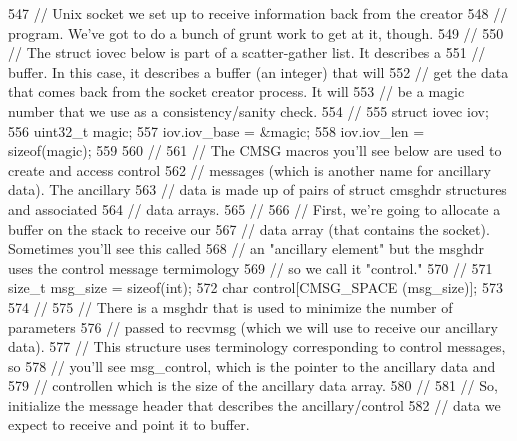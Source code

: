 \begin{DoxyCode}
547       \textcolor{comment}{// Unix socket we set up to receive information back from the creator}
548       \textcolor{comment}{// program.  We've got to do a bunch of grunt work to get at it, though.}
549       \textcolor{comment}{//}
550       \textcolor{comment}{// The struct iovec below is part of a scatter-gather list.  It describes a}
551       \textcolor{comment}{// buffer.  In this case, it describes a buffer (an integer) that will}
552       \textcolor{comment}{// get the data that comes back from the socket creator process.  It will}
553       \textcolor{comment}{// be a magic number that we use as a consistency/sanity check.}
554       \textcolor{comment}{// }
555       \textcolor{keyword}{struct }iovec iov;
556       uint32\_t magic;
557       iov.iov\_base = &magic;
558       iov.iov\_len = \textcolor{keyword}{sizeof}(magic);
559 
560       \textcolor{comment}{//}
561       \textcolor{comment}{// The CMSG macros you'll see below are used to create and access control }
562       \textcolor{comment}{// messages (which is another name for ancillary data).  The ancillary }
563       \textcolor{comment}{// data is made up of pairs of struct cmsghdr structures and associated}
564       \textcolor{comment}{// data arrays.}
565       \textcolor{comment}{//}
566       \textcolor{comment}{// First, we're going to allocate a buffer on the stack to receive our }
567       \textcolor{comment}{// data array (that contains the socket).  Sometimes you'll see this called}
568       \textcolor{comment}{// an "ancillary element" but the msghdr uses the control message termimology}
569       \textcolor{comment}{// so we call it "control."}
570       \textcolor{comment}{//}
571       \textcolor{keywordtype}{size\_t} msg\_size = \textcolor{keyword}{sizeof}(int);
572       \textcolor{keywordtype}{char} control[CMSG\_SPACE (msg\_size)];
573 
574       \textcolor{comment}{//}
575       \textcolor{comment}{// There is a msghdr that is used to minimize the number of parameters}
576       \textcolor{comment}{// passed to recvmsg (which we will use to receive our ancillary data).}
577       \textcolor{comment}{// This structure uses terminology corresponding to control messages, so}
578       \textcolor{comment}{// you'll see msg\_control, which is the pointer to the ancillary data and }
579       \textcolor{comment}{// controllen which is the size of the ancillary data array.}
580       \textcolor{comment}{//}
581       \textcolor{comment}{// So, initialize the message header that describes the ancillary/control}
582       \textcolor{comment}{// data we expect to receive and point it to buffer.}

\end{DoxyCode}
